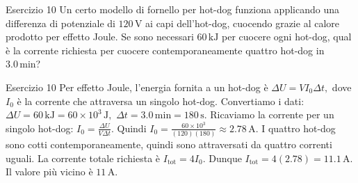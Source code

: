 \documentclass[a4paper]{article}
\begin{document}
\begin{snippetexercise}{Esercizio 10}
    Un certo modello di fornello per hot-dog funziona applicando una differenza
    di potenziale di \(120\,\mathrm{V}\) ai capi dell'hot-dog, cuocendo grazie
    al calore prodotto per effetto Joule. Se sono necessari \(60\,\mathrm{kJ}\)
    per cuocere ogni hot-dog, qual è la corrente richiesta per cuocere
    contemporaneamente quattro hot-dog in \(3.0\,\mathrm{min}\)?

\end{snippetexercise}
\begin{snippetsolution}{Esercizio 10}
    Per effetto Joule, l'energia fornita a un hot-dog è
    \(\Delta U = V I_0 \Delta t,\)
    dove \(I_0\) è la corrente che attraversa un singolo hot-dog.
    Convertiamo i dati:
    \(\Delta U = 60\,\mathrm{kJ} = 60 \times 10^3\,\mathrm{J},\)
    \(\Delta t = 3.0\,\mathrm{min} = 180\,\mathrm{s}.\)
    Ricaviamo la corrente per un singolo hot-dog:
    \(I_0 = \frac{\Delta U}{V\Delta t}.\)
    Quindi
    \(I_0 = \frac{60 \times 10^3}{(120)(180)} \approx 2.78\,\mathrm{A}.\)
    I quattro hot-dog sono cotti contemporaneamente, quindi sono attraversati
    da quattro correnti uguali. La corrente totale richiesta è
    \(I_{\mathrm{tot}} = 4I_0.\)
    Dunque
    \(I_{\mathrm{tot}} = 4(2.78) = 11.1\,\mathrm{A}.\)
    Il valore più vicino è
    \(\boxed{11\,\mathrm{A}}.\)
\end{snippetsolution}
\pagebreak
\end{document}
